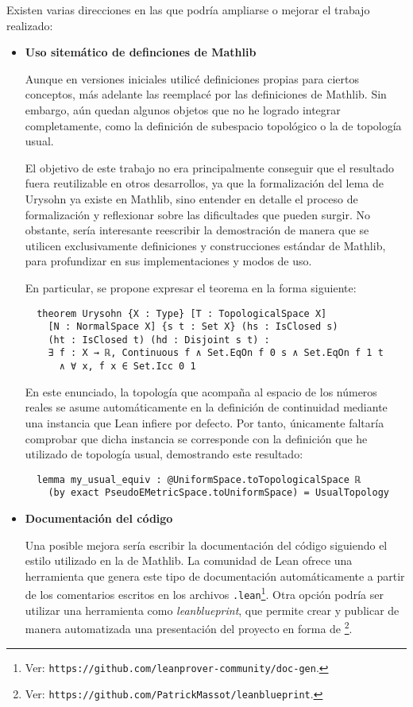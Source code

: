 Existen varias direcciones en las que podría ampliarse o mejorar el trabajo realizado:

\begin{itemize}
  \item \textbf{Uso sitemático de definciones de Mathlib}
  
  Aunque en versiones iniciales utilicé definiciones propias para ciertos conceptos, más adelante las reemplacé por las definiciones de Mathlib. Sin embargo, aún quedan algunos objetos que no he logrado integrar completamente, como la definición de subespacio topológico o la de topología usual.

  El objetivo de este trabajo no era principalmente conseguir que el resultado fuera reutilizable en otros desarrollos, ya que la formalización del lema de Urysohn ya existe en Mathlib, sino entender en detalle el proceso de formalización y reflexionar sobre las dificultades que pueden surgir. No obstante, sería interesante reescribir la demostración de manera que se utilicen exclusivamente definiciones y construcciones estándar de Mathlib, para profundizar en sus implementaciones y modos de uso.

  En particular, se propone expresar el teorema en la forma siguiente:

  \begin{lstlisting}
  theorem Urysohn {X : Type} [T : TopologicalSpace X]
    [N : NormalSpace X] {s t : Set X} (hs : IsClosed s)
    (ht : IsClosed t) (hd : Disjoint s t) :
    ∃ f : X → ℝ, Continuous f ∧ Set.EqOn f 0 s ∧ Set.EqOn f 1 t
      ∧ ∀ x, f x ∈ Set.Icc 0 1 \end{lstlisting}

  En este enunciado, la topología que acompaña al espacio de los números reales se asume automáticamente en la definición de continuidad mediante una instancia que Lean infiere por defecto. Por tanto, únicamente faltaría comprobar que dicha instancia se corresponde con la definición que he utilizado de topología usual, demostrando este resultado:

  \begin{lstlisting}
  lemma my_usual_equiv : @UniformSpace.toTopologicalSpace ℝ
    (by exact PseudoEMetricSpace.toUniformSpace) = UsualTopology \end{lstlisting}

  \item \textbf{Documentación del código}
  
  Una posible mejora sería escribir la documentación del código siguiendo el estilo utilizado en la de Mathlib. La comunidad de Lean ofrece una herramienta que genera este tipo de documentación automáticamente a partir de los comentarios escritos en los archivos \texttt{.lean}\footnote{Ver: \texttt{https://github.com/leanprover-community/doc-gen}.}. Otra opción podría ser utilizar una herramienta como \textit{leanblueprint}, que permite crear y publicar de manera automatizada una presentación del proyecto en forma de \footnote{Ver: \texttt{https://github.com/PatrickMassot/leanblueprint}.}.


\end{itemize}
